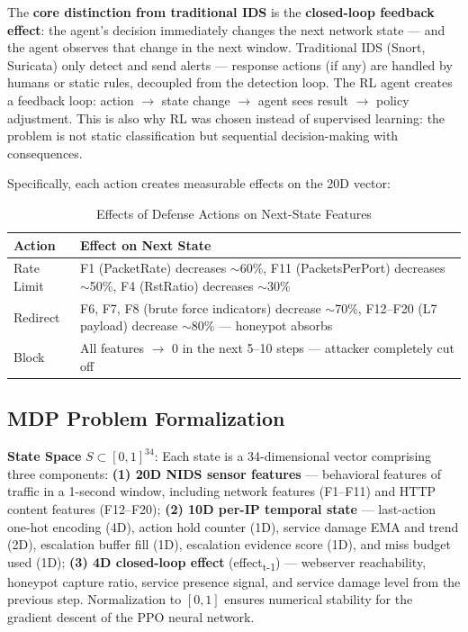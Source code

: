 \documentclass[12pt,a4paper]{report}
\begin{document}
The \textbf{core distinction from traditional IDS} is the \textbf{closed-loop feedback effect}: the agent's decision immediately changes the next network state --- and the agent observes that change in the next window. Traditional IDS (Snort, Suricata) only detect and send alerts --- response actions (if any) are handled by humans or static rules, decoupled from the detection loop. The RL agent creates a feedback loop: action $\to$ state change $\to$ agent sees result $\to$ policy adjustment. This is also why RL was chosen instead of supervised learning: the problem is not static classification but sequential decision-making with consequences.

Specifically, each action creates measurable effects on the 20D vector:

\begin{table}[h!]
\centering
\caption{Effects of Defense Actions on Next-State Features}
\begin{tabular}{L{3cm} L{10cm}}
\toprule
\textbf{Action} & \textbf{Effect on Next State} \\
\midrule
Rate Limit & F1 (PacketRate) decreases $\sim$60\%, F11 (PacketsPerPort) decreases $\sim$50\%, F4 (RstRatio) decreases $\sim$30\% \\
Redirect & F6, F7, F8 (brute force indicators) decrease $\sim$70\%, F12--F20 (L7 payload) decrease $\sim$80\% --- honeypot absorbs \\
Block & All features $\to$ 0 in the next 5--10 steps --- attacker completely cut off \\
\bottomrule
\end{tabular}
\end{table}

\subsection{MDP Problem Formalization}

\textbf{State Space} $S \subset [0,1]^{34}$: Each state is a 34-dimensional vector comprising three components: \textbf{(1) 20D NIDS sensor features} --- behavioral features of traffic in a 1-second window, including network features (F1--F11) and HTTP content features (F12--F20); \textbf{(2) 10D per-IP temporal state} --- last-action one-hot encoding (4D), action hold counter (1D), service damage EMA and trend (2D), escalation buffer fill (1D), escalation evidence score (1D), and miss budget used (1D); \textbf{(3) 4D closed-loop effect} (effect\textsubscript{t-1}) --- webserver reachability, honeypot capture ratio, service presence signal, and service damage level from the previous step. Normalization to $[0,1]$ ensures numerical stability for the gradient descent of the PPO neural network.
\end{document}
